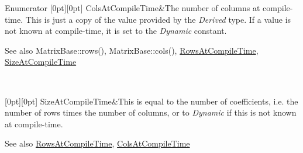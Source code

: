 \begin{DoxyEnumFields}{Enumerator}
[0pt][0pt]{}\mbox{\label{class_eigen_1_1_sparse_matrix_base_a11b30ed44f64a137b4fa1ee638ca2d36a27ba349f075d026c1f51d1ec69aa5b14}} 
Cols\+At\+Compile\+Time&The number of columns at compile-\/time. This is just a copy of the value provided by the {\itshape Derived} type. If a value is not known at compile-\/time, it is set to the {\itshape Dynamic} constant. \begin{DoxySeeAlso}{See also}
Matrix\+Base\+::rows(), Matrix\+Base\+::cols(), \mbox{\hyperlink{class_eigen_1_1_sparse_matrix_base_a11b30ed44f64a137b4fa1ee638ca2d36a456cda7b9d938e57194036a41d634604}{Rows\+At\+Compile\+Time}}, \mbox{\hyperlink{class_eigen_1_1_sparse_matrix_base_a11b30ed44f64a137b4fa1ee638ca2d36aa5022cfa2bb53129883e9b7b8abd3d68}{Size\+At\+Compile\+Time}} 
\end{DoxySeeAlso}
\\
\hline

[0pt][0pt]{}\mbox{\label{class_eigen_1_1_sparse_matrix_base_a11b30ed44f64a137b4fa1ee638ca2d36aa5022cfa2bb53129883e9b7b8abd3d68}} 
Size\+At\+Compile\+Time&This is equal to the number of coefficients, i.\+e. the number of rows times the number of columns, or to {\itshape Dynamic} if this is not known at compile-\/time. \begin{DoxySeeAlso}{See also}
\mbox{\hyperlink{class_eigen_1_1_sparse_matrix_base_a11b30ed44f64a137b4fa1ee638ca2d36a456cda7b9d938e57194036a41d634604}{Rows\+At\+Compile\+Time}}, \mbox{\hyperlink{class_eigen_1_1_sparse_matrix_base_a11b30ed44f64a137b4fa1ee638ca2d36a27ba349f075d026c1f51d1ec69aa5b14}{Cols\+At\+Compile\+Time}} 
\end{DoxySeeAlso}
\\
\hline


\end{DoxyEnumFields}
